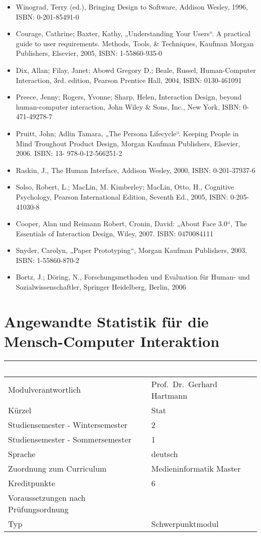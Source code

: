 \begin{itemize}
\item
  Winograd, Terry (ed.), Bringing Design to Software, Addison Wesley,
  1996, ISBN: 0-201-85491-0
\item
  Courage, Cathrine; Baxter, Kathy, „Understanding Your Users``. A
  practical guide to user requirements. Methods, Tools, \& Techniques,
  Kaufman Morgan Publishers, Elsevier, 2005, ISBN: 1-55860-935-0
\item
  Dix, Allan; Filay, Janet; Abowd Gregory D.; Beale, Russel,
  Human-Computer Interaction, 3rd. edition, Pearson Prentice Hall, 2004,
  ISBN: 0130-461091
\item
  Preece, Jenny; Rogers, Yvonne; Sharp, Helen, Interaction Design,
  beyond human-computer interaction, John Wiley \& Sons, Inc., New York,
  ISBN: 0-471-49278-7
\item
  Pruitt, John; Adlin Tamara, „The Persona Lifecycle``. Keeping People
  in Mind Troughout Product Design, Morgan Kaufman Publishers, Elsevier,
  2006. ISBN: 13- 978-0-12-566251-2
\item
  Raskin, J., The Human Interface, Addison Wesley, 2000, ISBN:
  0-201-37937-6
\item
  Solso, Robert, L.; MacLin, M. Kimberley; MacLin, Otto, H., Cognitive
  Psychology, Pearson International Edition, Seventh Ed., 2005, ISBN:
  0-205-41030-8
\item
  Cooper, Alan und Reimann Robert, Cronin, David: „About Face 3.0``, The
  Essentials of Interaction Design, Wiley, 2007. ISBN: 0470084111
\item
  Snyder, Carolyn, „Paper Prototyping``, Morgan Kaufman Publishers,
  2003, ISBN: 1-55860-870-2
\item
  Bortz, J.; Döring, N., Forschungsmethoden und Evaluation für Human-
  und Sozialwissenschaftler, Springer Heidelberg, Berlin, 2006
\end{itemize}

\chapter{Angewandte Statistik für die Mensch-Computer
Interaktion}\label{angewandte-statistik-fuxfcr-die-mensch-computer-interaktion}

\begin{longtable}[]{@{}ll@{}}
\toprule
~ & ~\tabularnewline
\midrule
\endhead
Modulverantwortlich & Prof.~Dr.~Gerhard Hartmann\tabularnewline
Kürzel & Stat\tabularnewline
Studiensemester - Wintersemester & 2\tabularnewline
Studiensemester - Sommersemester & 1\tabularnewline
Sprache & deutsch\tabularnewline
Zuordnung zum Curriculum & Medieninformatik Master\tabularnewline
Kreditpunkte & 6\tabularnewline
Voraussetzungen nach Prüfungsordnung &\tabularnewline
Typ & Schwerpunktmodul\tabularnewline
\bottomrule
\end{longtable}

